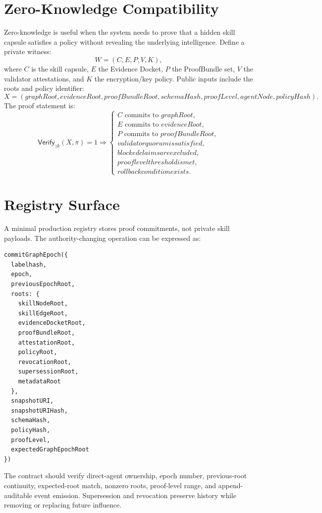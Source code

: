 \documentclass[11pt,letterpaper]{article}
\newcommand{\Verify}{\mathsf{Verify}}
\begin{document}
\section{Zero-Knowledge Compatibility}
Zero-knowledge is useful when the system needs to prove that a hidden skill capsule satisfies a policy without revealing the underlying intelligence. Define a private witness:
\begin{equation}
W=(C,E,P,V,K),
\end{equation}
where $C$ is the skill capsule, $E$ the Evidence Docket, $P$ the ProofBundle set, $V$ the validator attestations, and $K$ the encryption/key policy. Public inputs include the roots and policy identifier:
\begin{equation}
X=(graphRoot,evidenceRoot,proofBundleRoot,schemaHash,proofLevel,agentNode,policyHash).
\end{equation}
The proof statement is:
\begin{equation}
\Verify_{zk}(X,\pi)=1 \Rightarrow \begin{cases}
C \text{ commits to } graphRoot,\\
E \text{ commits to } evidenceRoot,\\
P \text{ commits to } proofBundleRoot,\\
validator quorum is satisfied,\\
blocked claims are excluded,\\
proof level threshold is met,\\
rollback condition exists.
\end{cases}
\end{equation}

\section{Registry Surface}
A minimal production registry stores proof commitments, not private skill payloads. The authority-changing operation can be expressed as:
\begin{lstlisting}[caption={CommitGraphEpochParams surface.}]
commitGraphEpoch({
  labelhash,
  epoch,
  previousEpochRoot,
  roots: {
    skillNodeRoot,
    skillEdgeRoot,
    evidenceDocketRoot,
    proofBundleRoot,
    attestationRoot,
    policyRoot,
    revocationRoot,
    supersessionRoot,
    metadataRoot
  },
  snapshotURI,
  snapshotURIHash,
  schemaHash,
  policyHash,
  proofLevel,
  expectedGraphEpochRoot
})
\end{lstlisting}
The contract should verify direct-agent ownership, epoch number, previous-root continuity, expected-root match, nonzero roots, proof-level range, and append-auditable event emission. Supersession and revocation preserve history while removing or replacing future influence.
\end{document}
